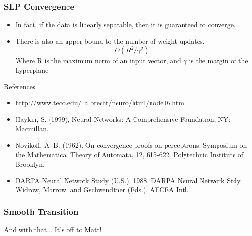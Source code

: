 \documentclass{beamer}
\begin{document}
\begin{frame}
\frametitle{SLP Convergence}
\begin{itemize}
\item In fact, if the data is linearly separable, then it is guaranteed to converge.

\item There is also an upper bound to the number of weight updates.$$O(R^2/\gamma^2)$$
Where R is the maximum norm of an input vector, and $\gamma$ is the margin of the hyperplane
\end{itemize}
\end{frame}

\begin{frame}{References}
\begin{itemize}
\item http://www.teco.edu/~albrecht/neuro/html/node16.html
\item Haykin, S. (1999), Neural Networks: A Comprehensive Foundation, NY: Macmillan.
\item  Novikoff, A. B. (1962). On convergence proofs on perceptrons. Symposium on the Mathematical Theory of Automata, 12, 615-622. Polytechnic Institute of Brooklyn.
\item DARPA Neural Network Study (U.S.). 1988. DARPA Neural Network Stdy. Widrow, Morrow, and Gschwendtner (Eds.). AFCEA Intl.

\end{itemize}
\end{frame}


\begin{frame}
\frametitle{Smooth Transition}
And with that... It's off to Matt!
\end{frame}
\end{document}
